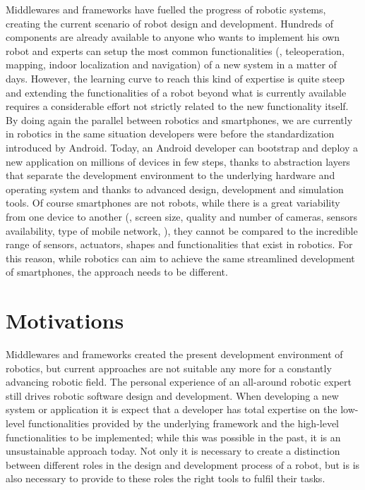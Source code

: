 Middlewares and frameworks have fuelled the progress of robotic systems, creating the current scenario of robot design and development. Hundreds of components are already available to anyone who wants to implement his own robot and experts can setup the most common functionalities (\ie, teleoperation, mapping, indoor localization and navigation) of a new system in a matter of days. However, the learning curve to reach this kind of expertise is quite steep and extending the functionalities of a robot beyond what is currently available requires a considerable effort not strictly related to the new functionality itself.  By doing again the parallel between robotics and smartphones, we are currently in robotics in the same situation developers were before the standardization introduced by Android. Today, an Android developer can bootstrap and deploy a new application on millions of devices in few steps, thanks to abstraction layers that separate the development environment to the underlying hardware and operating system and thanks to advanced design, development and simulation tools. Of course smartphones are not robots, while there is a great variability from one device to another (\eg, screen size, quality and number of cameras, sensors availability, type of mobile network, \etc), they cannot be compared to the incredible range of sensors, actuators, shapes and functionalities that exist in robotics. For this reason, while robotics can aim to achieve the same streamlined development of smartphones, the approach needs to be different.

\section{Motivations}
Middlewares and frameworks created the present development environment of robotics, but current approaches are not suitable any more for a constantly advancing robotic field. The personal experience of an all-around robotic expert still drives robotic software design and development. When developing a new system or application it is expect that a developer has total expertise on the low-level functionalities provided by the underlying framework and the high-level functionalities to be implemented; while this was possible in the past, it is an unsustainable approach today. Not only it is necessary to create a distinction between different roles in the design and development process of a robot, but is is also necessary to provide to these roles the right tools to fulfil  their tasks.

